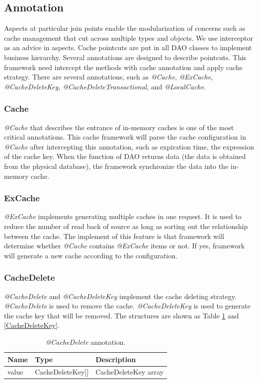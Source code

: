 \documentclass{singlecol-new}
\theoremstyle{TH}{
\newtheorem{lemma}{Lemma}
\newtheorem{theorem}[lemma]{Theorem}
\newtheorem{corrolary}[lemma]{Corrolary}
\newtheorem{conjecture}[lemma]{Conjecture}
\newtheorem{proposition}[lemma]{Proposition}
\newtheorem{claim}[lemma]{Claim}
\newtheorem{stheorem}[lemma]{Wrong Theorem}
}
\theoremstyle{THrm}{
\newtheorem{definition}{Definition}[section]
\newtheorem{question}{Question}[section]
\newtheorem{remark}{Remark}
\newtheorem{scheme}{Scheme}
}
\theoremstyle{THhit}{
\newtheorem{case}{Case}[section]
}
\begin{document}
\subsection{Annotation}
Aspects at particular join points enable the modularization of concerns such as cache management that cut across multiple types and objects. We use interceptor as an advice in aspects. Cache pointcuts are put in all DAO classes to implement business hierarchy. Several annotations are designed to describe pointcuts. This framework need intercept the methods with cache annotation and apply cache strategy. There are several annotations, such as \textit{@Cache}, \textit{@ExCache}, \textit{@CacheDeleteKey}, \textit{@CacheDeleteTransactional}, and \textit{@LocalCache}.

\subsubsection{Cache}
\textit{@Cache} that describes the entrance of in-memory caches is one of the most critical annotations. This cache framework will parse the cache configuration in \textit{@Cache} after intercepting this annotation, such as expiration time, the expression of the cache key. When the function of DAO returns data (the data is obtained from the physical database), the framework synchronize the data into the in-memory cache.

\subsubsection{ExCache}
\textit{@ExCache} implements generating multiple caches in one request. It is used to reduce the number of read back of source as long as sorting out the relationship between the cache. The implement of this feature is that framework will determine whether \textit{@Cache} contains \textit{@ExCache} items or not. If yes, framework will generate a new cache according to the configuration.

\subsubsection{CacheDelete}
\textit{@CacheDelete} and \textit{@CacheDeleteKey} implement the cache deleting strategy. \textit{@CacheDelete} is used to remove the cache. \textit{@CacheDeleteKey} is used to generate the cache key that will be removed. The structures are shown as Table \ref{CacheDelete} and \ref{CacheDeleteKey}.

\begin{table}[htb]
\begin{center}
 \caption{\label{CacheDelete}\textit{@CacheDelete} annotation.}
 \begin{tabular}{lll}
 \toprule
Name & Type & Description\\
 \midrule
value & CacheDeleteKey[] & CacheDeleteKey array\\
\bottomrule
 \end{tabular}
\end{center}
\end{table}
\end{document}
